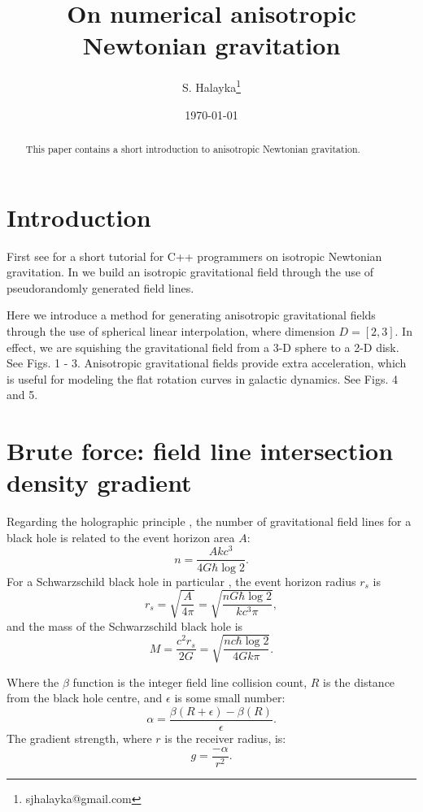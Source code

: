 \documentclass[12pt]{article}
\title{On numerical anisotropic Newtonian gravitation}
\author{S. Halayka\footnote{sjhalayka@gmail.com}}
\date{\today\;\currenttime}
\begin{document}
 
\maketitle

\begin{abstract}
This paper contains a short introduction to anisotropic Newtonian gravitation.
\end{abstract}



\section{Introduction}

First see \cite{halayka} for a short tutorial for C++ programmers on isotropic Newtonian gravitation.
In \cite{halayka} we build an isotropic gravitational field through the use of pseudorandomly generated field lines.

Here we introduce a method for generating anisotropic gravitational fields through the use of spherical linear interpolation, where dimension $D = [2, 3]$.
In effect, we are squishing the gravitational field from a 3-D sphere to a 2-D disk.
See Figs. 1 - 3.
Anisotropic gravitational fields provide extra acceleration, which is useful for modeling the flat rotation curves in galactic dynamics.
See Figs. 4 and 5.




\section{Brute force: field line intersection density gradient}

Regarding the holographic principle \cite{hooft, susskind}, the number of gravitational field lines for a black hole is related to the event horizon area $A$:
\begin{equation}
n = \frac{A k c^3}{ 4 G \hbar \log 2}.
\end{equation}
For a Schwarzschild black hole in particular \cite{misner}, the event horizon radius $r_s$ is
\begin{equation}
r_s = \sqrt{\frac{A}{4 \pi}} = \sqrt{\frac{n G \hbar \log 2}{k c^3 \pi}},
\end{equation}
and the mass of the Schwarzschild black hole is
\begin{equation}
M = \frac{c^2 r_s}{2 G} = \sqrt{\frac{n c \hbar \log 2}{4 G k \pi}}.
\end{equation}

Where the $\beta$ function is the integer field line collision count, $R$ is the distance from the black hole centre, and $\epsilon$ is some small number:
\begin{equation}
\alpha = \frac{\beta(R + \epsilon) - \beta(R)}{\epsilon}.
\end{equation}
The gradient strength, where $r$ is the receiver radius, is:
\begin{equation}
g = \frac{-\alpha}{r^2}. 
\end{equation}
\end{document}
